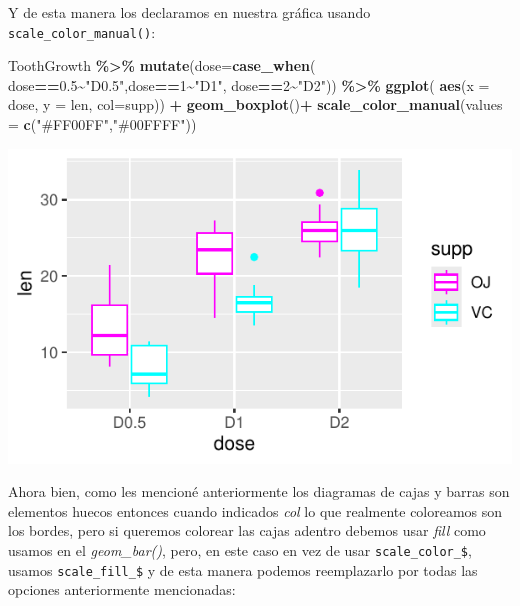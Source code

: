\documentclass[
]{book}
\newenvironment{Shaded}{\begin{snugshade}}{\end{snugshade}}
\newcommand{\AttributeTok}[1]{\textcolor[rgb]{0.13,0.29,0.53}{#1}}
\newcommand{\DecValTok}[1]{\textcolor[rgb]{0.00,0.00,0.81}{#1}}
\newcommand{\FloatTok}[1]{\textcolor[rgb]{0.00,0.00,0.81}{#1}}
\newcommand{\FunctionTok}[1]{\textcolor[rgb]{0.13,0.29,0.53}{\textbf{#1}}}
\newcommand{\NormalTok}[1]{#1}
\newcommand{\SpecialCharTok}[1]{\textcolor[rgb]{0.81,0.36,0.00}{\textbf{#1}}}
\newcommand{\StringTok}[1]{\textcolor[rgb]{0.31,0.60,0.02}{#1}}
\begin{document}
\hfill\break
Y de esta manera los declaramos en nuestra gráfica usando \texttt{scale\_color\_manual()}:\\

\begin{Shaded}
\begin{Highlighting}[]
\NormalTok{ToothGrowth }\SpecialCharTok{\%\textgreater{}\%}  \FunctionTok{mutate}\NormalTok{(}\AttributeTok{dose=}\FunctionTok{case\_when}\NormalTok{(}
\NormalTok{  dose}\SpecialCharTok{==}\FloatTok{0.5}\SpecialCharTok{\textasciitilde{}}\StringTok{"D0.5"}\NormalTok{,dose}\SpecialCharTok{==}\DecValTok{1}\SpecialCharTok{\textasciitilde{}}\StringTok{"D1"}\NormalTok{, dose}\SpecialCharTok{==}\DecValTok{2}\SpecialCharTok{\textasciitilde{}}\StringTok{"D2"}\NormalTok{)) }\SpecialCharTok{\%\textgreater{}\%} \FunctionTok{ggplot}\NormalTok{(}
    \FunctionTok{aes}\NormalTok{(}\AttributeTok{x =}\NormalTok{ dose, }\AttributeTok{y =}\NormalTok{ len, }\AttributeTok{col=}\NormalTok{supp)) }\SpecialCharTok{+}  \FunctionTok{geom\_boxplot}\NormalTok{()}\SpecialCharTok{+}
  \FunctionTok{scale\_color\_manual}\NormalTok{(}\AttributeTok{values =} \FunctionTok{c}\NormalTok{(}\StringTok{"\#FF00FF"}\NormalTok{,}\StringTok{"\#00FFFF"}\NormalTok{))}
\end{Highlighting}
\end{Shaded}

\begin{center}\includegraphics{_main_files/figure-latex/unnamed-chunk-212-1} \end{center}

\hfill\break
Ahora bien, como les mencioné anteriormente los diagramas de cajas y barras son elementos huecos entonces cuando indicados \emph{col} lo que realmente coloreamos son los bordes, pero si queremos colorear las cajas adentro debemos usar \emph{fill} como usamos en el \emph{geom\_bar()}, pero, en este caso en vez de usar \texttt{scale\_color\_\$}, usamos \texttt{scale\_fill\_\$} y de esta manera podemos reemplazarlo por todas las opciones anteriormente mencionadas:\\
\end{document}
